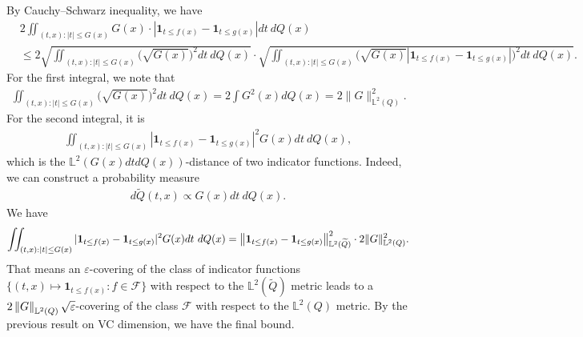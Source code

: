 \documentclass[11pt,letterpaper]{article}
\numberwithin{theorem}{lecture}
\numberwithin{proposition}{lecture}
\numberwithin{lemma}{lecture}
\numberwithin{claim}{lecture}
\numberwithin{corollary}{lecture}
\numberwithin{definition}{lecture}
\numberwithin{conjecture}{lecture}
\numberwithin{remark}{lecture}
\numberwithin{example}{lecture}
\numberwithin{equation}{lecture}
\begin{document}
By Cauchy--Schwarz inequality, we have
\begin{align*}
  &2 \iint_{(t, x): |t| \leq G(x)} G (x) \cdot | \bm{1}_{t \leq f(x)} - \bm{1}_{t \leq g(x)} | dt~ d Q(x)\\
  &\leq 2 \sqrt{\iint_{(t, x): |t| \leq G(x)} \big( \sqrt{G (x)} \big)^2 dt~ d Q(x)} \cdot \sqrt{\iint_{(t, x): |t| \leq G(x)} \big( \sqrt{G(x)}  | \bm{1}_{t \leq f(x)} - \bm{1}_{t \leq g(x)} | \big)^2 dt~ d Q(x)}.
\end{align*}
For the first integral, we note that
\begin{align*}
  \iint_{(t, x): |t| \leq G(x)} \big( \sqrt{G (x)} \big)^2 dt~ d Q(x) = 2 \int G^2 (x) d Q(x) = 2 \|G\|_{\mathbb{L}^2 (Q)}^2.
\end{align*}
For the second integral, it is
\begin{align*}
  \iint_{(t, x): |t| \leq G(x)}  | \bm{1}_{t \leq f(x)} - \bm{1}_{t \leq g(x)} |^2  G(x) dt~ d Q(x),
\end{align*}
which is the $\mathbb{L}^2 (G (x) dt d Q(x))$-distance of two indicator functions. Indeed, we can construct a probability measure
\begin{align*}
  d \widetilde{Q} (t, x) \propto G(x)dt~ d Q(x).
\end{align*}
We have
\begin{align*}
  \iint_{(t, x): |t| \leq G(x)}  | \bm{1}_{t \leq f(x)} - \bm{1}_{t \leq g(x)} |^2  G(x) dt~ d Q(x) = \left\| \bm{1}_{t \leq f(x)} - \bm{1}_{t \leq g(x)}\right\|_{\mathbb{L}^2 (\widetilde{Q})}^2 \cdot 2 \|G\|_{\mathbb{L}^2 (Q)}^2.
\end{align*}
That means an $\varepsilon$-covering of the class of indicator functions $\{(t, x) \mapsto \bm{1}_{t \leq f(x)}: f \in \mathcal{F}\}$ with respect to the $\mathbb{L}^2 (\widetilde{Q})$ metric leads to a $2 \left\| G\right\|_{\mathbb{L}^2 (Q)} \sqrt{\varepsilon}$-covering of the class $\mathcal{F}$ with respect to the $\mathbb{L}^2 (Q)$ metric. By the previous result on VC dimension, we have the final bound.
\end{document}
